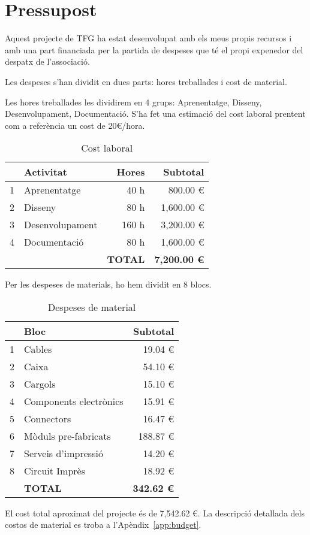 \chapter{Pressupost}\label{chapter:pressupost}

Aquest projecte de TFG ha estat desenvolupat amb els meus propis recursos i amb una part financiada per la partida de despeses que té el propi expenedor del despatx de l'associació.

Les despeses s'han dividit en dues parts: hores treballades i cost de material.

Les hores treballades les dividirem en 4 grups: Aprenentatge, Disseny, Desenvolupament, Documentació. S'ha fet una estimació del cost laboral prentent com a referència un cost de 20\euro /hora.

\begin{table}[H]
\centering
\begin{tabular}{l l r r}
&Activitat&Hores&Subtotal\\
\hline\hline
1&Aprenentatge&40 h&800.00 \euro\\
2&Disseny&80 h&1,600.00 \euro\\
3&Desenvolupament&160 h&3,200.00 \euro\\
4&Documentació&80 h&1,600.00 \euro\\[0.3cm]
& &  \textbf{TOTAL} & \textbf{7,200.00 \euro}
\end{tabular}
\caption{Cost laboral}
\label{table:activity_budget}
\end{table}

Per les despeses de materials, ho hem dividit en 8 blocs.

\begin{table}[H]
\centering
\begin{tabular}{l l r}
&Bloc&Subtotal\\
\hline\hline
1&Cables&19.04 \euro\\
2&Caixa&54.10 \euro\\
3&Cargols&15.10 \euro\\
4&Components electrònics&15.91 \euro\\
5&Connectors&16.47 \euro\\
6&Mòduls pre-fabricats&188.87 \euro\\
7&Serveis d'impressió&14.20 \euro\\
8&Circuit Imprès&18.92 \euro\\[0.3cm]
&  \textbf{TOTAL} & \textbf{342.62 \euro}
\end{tabular}
\caption{Despeses de material}
\label{table:material_budget}
\end{table}

El cost total aproximat del projecte és de 7,542.62 \euro.
La descripció detallada dels costos de material es troba a l'Apèndix~\ref{app:budget}.

